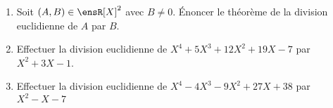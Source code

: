 \begin{enumerate}
    \item Soit $(A, B) \in \ensR[X]^2$ avec $B \neq 0$. Énoncer le théorème de la division euclidienne de $A$ par $B$.
    \item Effectuer la division euclidienne de $X^4 + 5X^3 + 12X^2 + 19X - 7$ par $X^2 + 3X - 1$.
    \item Effectuer la division euclidienne de $X^4 - 4X^3 - 9X^2 + 27X + 38$ par $X^2 - X - 7$
\end{enumerate}